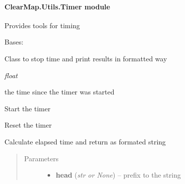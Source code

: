 \documentclass[letterpaper,10pt,english]{sphinxmanual}
\begin{document}
\paragraph{ClearMap.Utils.Timer module}
\label{api/ClearMap.Utils:module-ClearMap.Utils.Timer}\label{api/ClearMap.Utils:clearmap-utils-timer-module}
Provides tools for timing

\begin{fulllineitems}
\label{api/ClearMap.Utils:ClearMap.Utils.Timer.Timer}
Bases: 

Class to stop time and print results in formatted way

\begin{fulllineitems}
\label{api/ClearMap.Utils:ClearMap.Utils.Timer.Timer.time}
\emph{float}

the time since the timer was started

\end{fulllineitems}


\begin{fulllineitems}
\label{api/ClearMap.Utils:ClearMap.Utils.Timer.Timer.start}
Start the timer

\end{fulllineitems}


\begin{fulllineitems}
\label{api/ClearMap.Utils:ClearMap.Utils.Timer.Timer.reset}
Reset the timer

\end{fulllineitems}


\begin{fulllineitems}
\label{api/ClearMap.Utils:ClearMap.Utils.Timer.Timer.elapsedTime}
Calculate elapsed time and return as formated string
\begin{quote}\begin{description}
\item[{Parameters}] \leavevmode\begin{itemize}
\item {} 
\textbf{head} (\emph{str or None}) --
prefix to the string


\end{itemize}
\end{description}
\end{quote}
\end{fulllineitems}
\end{fulllineitems}
\end{document}
